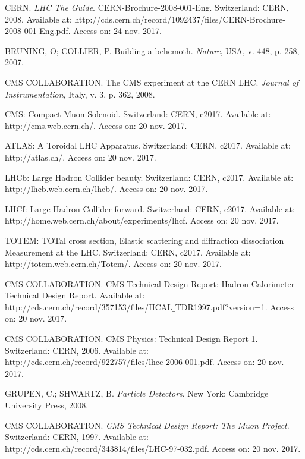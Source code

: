 \begin{thebibliography}{}
CERN. \textit{LHC The Guide}. CERN-Brochure-2008-001-Eng. Switzerland: CERN, 2008. Available at: http://cds.cern.ch/record/1092437/files/CERN-Brochure-2008-001-Eng.pdf. Access on: 24 nov. 2017.

BRUNING, O; COLLIER, P. Building a behemoth. \textit{Nature}, USA, v. 448, p. 258, 2007.

CMS COLLABORATION. The CMS experiment at the CERN LHC. \textit{Journal of Instrumentation}, Italy, v. 3, p. 362, 2008.

CMS: Compact Muon Solenoid. Switzerland: CERN, c2017. Available at: http://cms.web.cern.ch/. Access on: 20 nov. 2017.

ATLAS: A Toroidal LHC Apparatus. Switzerland: CERN, c2017. Available at: http://atlas.ch/. Access on: 20 nov. 2017.

LHCb: Large Hadron Collider beauty. Switzerland: CERN, c2017. Available at: http://lhcb.web.cern.ch/lhcb/. Access on: 20 nov. 2017.

LHCf: Large Hadron Collider forward. Switzerland: CERN, c2017. Available at: http://home.web.cern.ch/about/experiments/lhcf. Access on: 20 nov. 2017.

TOTEM: TOTal cross section, Elastic scattering and diffraction dissociation Measurement at the LHC. Switzerland: CERN, c2017. Available at: http://totem.web.cern.ch/Totem/. Access on: 20 nov. 2017.

CMS COLLABORATION. CMS Technical Design Report: Hadron Calorimeter Technical Design Report. Available at: http://cds.cern.ch/record/357153/files/HCAL$\_$TDR1997.pdf?version=1. Access on: 20 nov. 2017.

CMS COLLABORATION. CMS Physics: Technical Design Report 1. Switzerland: CERN, 2006. Available at: http://cds.cern.ch/record/922757/files/lhcc-2006-001.pdf. Access on: 20 nov. 2017.

GRUPEN, C.; SHWARTZ, B. \textit{Particle Detectors}. New York: Cambridge University Press, 2008.

CMS COLLABORATION. \textit{CMS Technical Design Report: The Muon Project}. Switzerland: CERN, 1997. Available at: http://cds.cern.ch/record/343814/files/LHC-97-032.pdf. Access on: 20 nov. 2017. 


\end{thebibliography}
